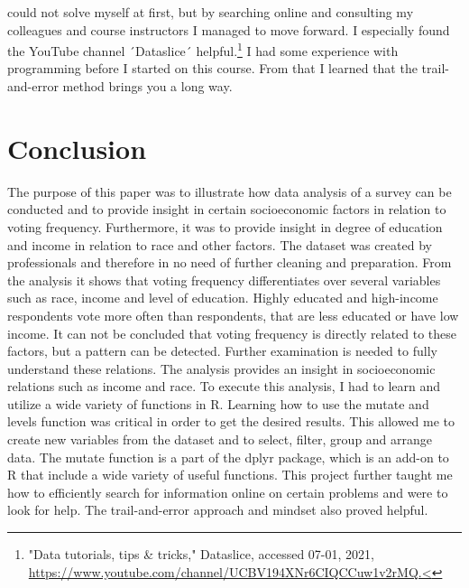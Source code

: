 \documentclass{article}
\begin{document}
could not solve myself at first, but by searching online and consulting my colleagues and course instructors I managed to move forward. I especially found the YouTube channel ´Dataslice´ helpful.\footnote{  "Data tutorials, tips & tricks," Dataslice, accessed 07-01, 2021, \url{https://www.youtube.com/channel/UCBV194XNr6CIQCCuw1v2rMQ.<}}  I had some experience with programming before I started on this course. From that I learned that the trail-and-error method brings you a long way. 

\section{Conclusion}

The purpose of this paper was to illustrate how data analysis of a survey can be conducted and to provide insight in certain socioeconomic factors in relation to voting frequency. Furthermore, it was to provide insight in degree of education and income in relation to race and other factors. The dataset was created by professionals and therefore in no need of further cleaning and preparation. From the analysis it shows that voting frequency differentiates over several variables such as race, income and level of education. Highly educated and high-income respondents vote more often than respondents, that are less educated or have low income. It can not be concluded that voting frequency is directly related to these factors, but a pattern can be detected. Further examination is needed to fully understand these relations. The analysis provides an insight in socioeconomic relations such as income and race.  
To execute this analysis, I had to learn and utilize a wide variety of functions in R. Learning how to use the mutate and levels function was critical in order to get the desired results. This allowed me to create new variables from the dataset and to select, filter, group and arrange data. The mutate function is a part of the dplyr package, which is an add-on to R that include a wide variety of useful functions. This project further taught me how to efficiently search for information online on certain problems and were to look for help. The trail-and-error approach and mindset also proved helpful.
\pagebreak
\end{document}
